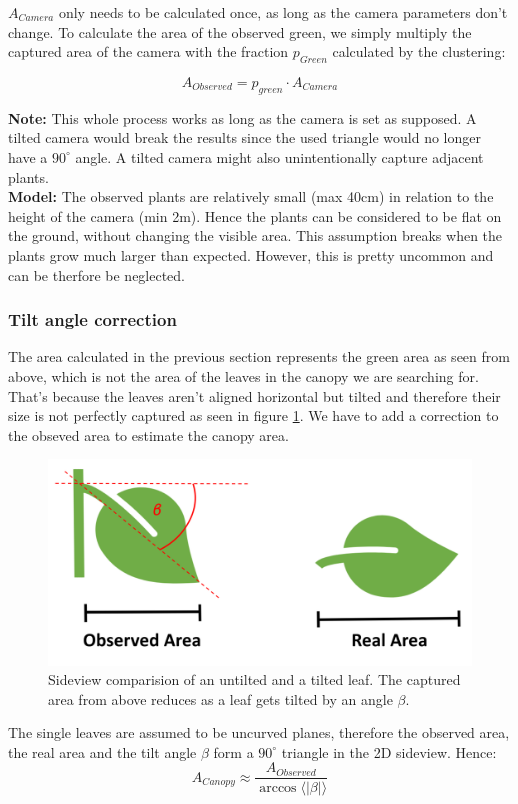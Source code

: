 $A_{Camera}$ only needs to be calculated once, as long as the camera parameters don't change. To calculate the area of the observed green, we simply multiply the captured area of the camera with the fraction $p_{Green}$ calculated by the clustering: 

$$A_{Observed} = p_{green}\cdot A_{Camera}$$

\textbf{Note:} This whole process works as long as the camera is set as supposed. A tilted camera would break the results since the used triangle would no longer have a $90^{\circ}$ angle. A tilted camera might also unintentionally capture adjacent plants.\\
\textbf{Model:} The observed plants are relatively small (max 40cm) in relation to the height of the camera (min 2m). Hence the plants can be considered to be flat on the ground, without changing the visible area. This assumption breaks when the plants grow much larger than expected. However, this is pretty uncommon and can be therfore be neglected.
\subsubsection{Tilt angle correction}
The area calculated in the previous section represents the green area as seen from above, which is not the area of the leaves in the canopy we are searching for. That's because the leaves aren't aligned horizontal but tilted and therefore their size is not perfectly captured as seen in figure \ref{fig:tiltedLeaf}. We have to add a correction to the obseved area to estimate the canopy area.\\
   \begin{figure}[H]
       \centering
       \includegraphics[scale=0.6]{tiltedLeaf.PNG}
       \caption{Sideview comparision of an untilted and a tilted leaf. The captured area from above reduces as a leaf gets tilted by an angle $\beta$.}
       \label{fig:tiltedLeaf}
   \end{figure}
The single leaves are assumed to be uncurved planes, therefore the observed area, the real area and the tilt angle $\beta$ form a $90^{\circ}$ triangle in the 2D sideview. Hence:
$$A_{Canopy} \approx \frac{A_{Observed}}{\arccos \langle |\beta |\rangle }$$

